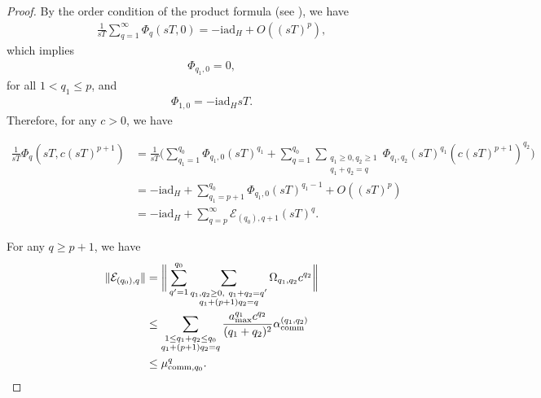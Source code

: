 \documentclass[aps,pra,reprint,groupedaddress,floatfix]{revtex4-2}
\renewcommand{\i}{\mathrm{i}}
\renewcommand{\L}{\mathcal{L}}
\newcommand{\ad}{\mathrm{ad}}
\newcommand{\E}{\mathcal{E}}
\begin{document}
\begin{proof}
    By the order condition of the product formula (see \citep[Lemma 2]{watson2025exponentially}), we have \begin{align*}
        \frac{1}{sT}\sum_{q=1}^{\infty} \Phi_{q}(sT,0) = -\i \ad_H + O((sT)^p),
    \end{align*}
    which implies \begin{align*}
        \Phi_{q_1, 0} = 0,
    \end{align*}
    for all $1 <q_1 \le p$, and \begin{align*}
        \Phi_{1,0} = - \i \ad_H sT.
    \end{align*} 
    Therefore, for any $c>0$, we have
    \begin{widetext}
    \begin{align*}
        \frac{1}{sT} \Phi_{q}(sT,c(sT)^{p+1})&= \frac{1}{sT}\Big(\sum_{q_1=1}^{q_0}\Phi_{q_1, 0}(sT)^{q_1} + \sum_{q = 1}^{q_0}\sum_{\substack{q_1\ge 0,q_2\ge 1\\ q_1+q_2 = q}} \Phi_{q_1, q_2} (sT)^{q_1}(c(sT)^{p+1})^{q_2}\Big) \\
        & = -\i \ad_H + \sum_{q_1 = p+1}^{q_0} \Phi_{q_1, 0} (sT)^{q_1-1} + O((sT)^{p}) \\
        & = -\i \ad_H + \sum_{q = p}^{\infty} \E_{(q_0),q+1} (sT)^{q}.
    \end{align*}
    \end{widetext}
    For any $q\ge p+1$, we have
    \begin{align*}
        \|\E_{(q_0),q}\| &= \bigg\|\sum_{q'=1}^{q_0}\sum_{\substack{q_1, q_2\ge 0,~ q_1+q_2=q' \\
        q_1+(p+1)q_2 = q}} \Omega_{q_1,q_2} c^{q_2} \bigg\|\\
        &\le \sum_{\substack{1\le q_1+ q_2\le q_0 \\
        q_1+(p+1)q_2 = q}}\frac{a_{\max}^{q_1}c^{q_2}}{(q_1+q_2)^2} \alpha_{\rm comm}^{(q_1, q_2)} \\
        &\le  \mu_{\mathrm{comm},q_0}^q.
    \end{align*}
\end{proof}
\end{document}
